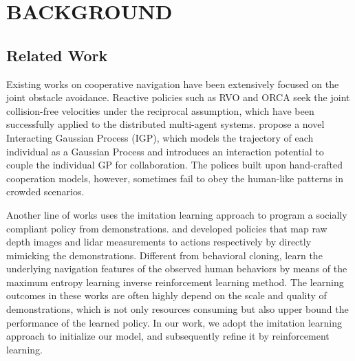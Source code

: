 \documentclass[letterpaper, 10 pt, conference]{ieeeconf}  %
\begin{document}
\section{BACKGROUND} \label{sec:background} 

\subsection{Related Work}

Existing works on cooperative navigation have been extensively focused on the joint obstacle avoidance. Reactive policies such as RVO \cite{berg_reciprocal_2008} and ORCA \cite{van_den_berg_reciprocal_2011} seek the joint collision-free velocities under the reciprocal assumption, which have been successfully applied to the distributed multi-agent systems. \cite{trautman_unfreezing_2010} propose a novel Interacting Gaussian Process (IGP), which models the trajectory of each individual as a Gaussian Process and introduces an interaction potential to couple the individual GP for collaboration. The polices built upon hand-crafted cooperation models, however, sometimes fail to obey the human-like patterns in crowded scenarios.

Another line of works uses the imitation learning approach to program a socially compliant policy from demonstrations. \cite{tai_socially_2017} and \cite{long_deep-learned_2017} developed policies that map raw depth images and lidar measurements to actions respectively by directly mimicking the demonstrations. Different from behavioral cloning, \cite{roy_feature-based_2013, kretzschmar_socially_2016, pfeiffer_predicting_2016} learn the underlying navigation features of the observed human behaviors by means of the maximum entropy learning inverse reinforcement learning method. The learning outcomes in these works are often highly depend on the scale and quality of demonstrations, which is not only resources consuming but also upper bound the performance of the learned policy. In our work, we adopt the imitation learning approach to initialize our model, and subsequently refine it by reinforcement learning. 
\end{document}
